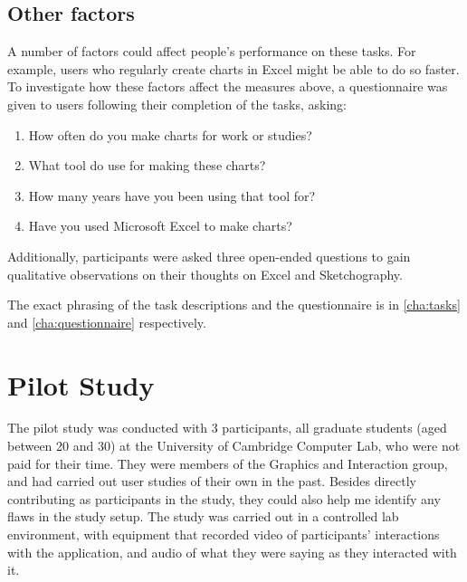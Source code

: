 \subsection*{Other factors}
A number of factors could affect people's performance on these tasks. For example, users who regularly create charts in Excel might be able to do so faster. To investigate how these factors affect the measures above, a questionnaire was given to users following their completion of the tasks, asking:

\begin{enumerate}
\item How often do you make charts for work or studies?
\item What tool do use for making these charts?
\item How many years have you been using that tool for?
\item Have you used Microsoft Excel to make charts?
\end{enumerate}

Additionally, participants were asked three open-ended questions to gain qualitative observations on their thoughts on Excel and Sketchography.

The exact phrasing of the task descriptions and the questionnaire is in \autoref{cha:tasks} and \autoref{cha:questionnaire} respectively.


\section{Pilot Study}
The pilot study was conducted with 3 participants, all graduate students (aged between 20 and 30) at the University of Cambridge Computer Lab, who were not paid for their time. They were members of the Graphics and Interaction group, and had carried out user studies of their own in the past. Besides directly contributing as participants in the study, they could also help me identify any flaws in the study setup. The study was carried out in a controlled lab environment, with equipment that recorded video of participants' interactions with the application, and audio of what they were saying as they interacted with it.

